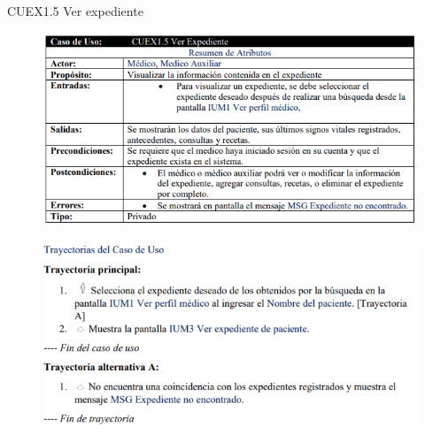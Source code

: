 \documentclass[12pt,letterpaper]{article}
\begin{document}
            \newpage
            CUEX1.5 Ver expediente 
            \begin{figure}[H]
                \centering
                \includegraphics [scale=0.8]{specs/specVerExpediente}
            \end{figure}
            \begin{figure}[H]
                \centering
                \includegraphics [scale=0.9]{specs/trayVerExpediente}
            \end{figure}
\end{document}
